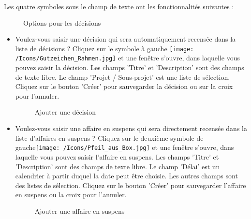 \vspace{\baselineskip}

Les quatre symboles sous le champ de texte ont les fonctionnalités suivantes :

\begin{figure}[H]
\caption{Options pour les décisions}
\end{figure}

\begin{itemize}
\item
Voulez-vous saisir une décision qui sera automatiquement recensée dans la liste de décisions ? Cliquez sur le symbole à gauche \texttt{[image: /Icons/Gutzeichen\_Rahmen.jpg]}  et une fenêtre s'ouvre, dans laquelle vous pouvez saisir la décision. Les champs 'Titre'  et 'Description'  sont des champs de texte libre. Le champ 'Projet / Sous-projet'  est une liste de sélection. Cliquez sur le bouton 'Créer'  pour sauvegarder la décision ou sur la croix  pour l'annuler.

\begin{figure}[H]
\caption{Ajouter une décision}
\end{figure}

\end{itemize}

\begin{itemize}
\item
Voulez-vous saisir une affaire en suspens qui sera directement recensée dans la liste d'affaires en suspens ? Cliquez sur le deuxième symbole de gauche\texttt{[image: /Icons/Pfeil\_aus\_Box.jpg]}  et une fenêtre s'ouvre, dans laquelle vous pouvez saisir l'affaire en suspens. Les champs 'Titre'  et 'Description'  sont des champs de texte libre. Le champ 'Délai'  est un calendrier à partir duquel la date peut être choisie. Les autres champs  sont des listes de sélection. Cliquez sur le bouton 'Créer'  pour sauvegarder l'affaire en suspens ou la croix  pour l'annuler.

\begin{figure}[H]
\caption{Ajouter une affaire en suspens}
\end{figure}

\end{itemize}

